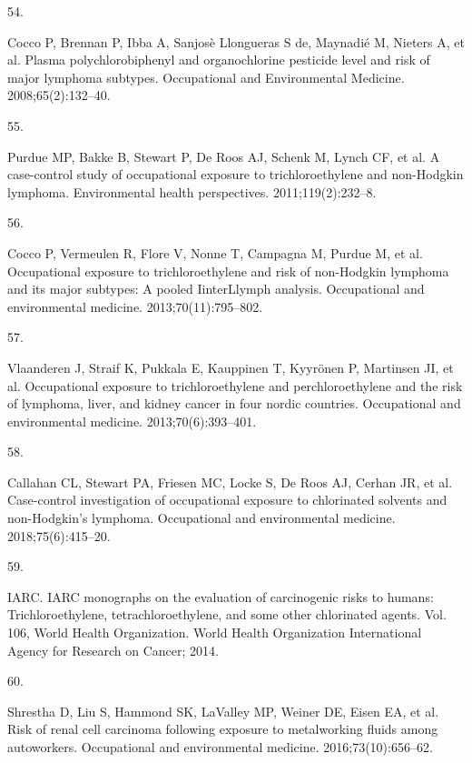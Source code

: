 \documentclass[
  11pt,
  letterpaper,
  DIV=11,
  numbers=noendperiod]{scrartcl}
\newlength{\cslhangindent}
\newlength{\csllabelwidth}
\newenvironment{CSLReferences}[2] %
 {\begin{list}{}{%
  \setlength{\itemindent}{0pt}
  \setlength{\leftmargin}{0pt}
  \setlength{\parsep}{0pt}
  \ifodd #1
   \setlength{\leftmargin}{\cslhangindent}
   \setlength{\itemindent}{-1\cslhangindent}
  \fi
  \setlength{\itemsep}{#2\baselineskip}}}
 {\end{list}}
\newcommand{\CSLLeftMargin}[1]{\parbox[t]{\csllabelwidth}{\strut#1\strut}}
\newcommand{\CSLRightInline}[1]{\parbox[t]{\linewidth - \csllabelwidth}{\strut#1\strut}}
\begin{document}
\begin{CSLReferences}{1}{0}
\CSLLeftMargin{54. }%
\CSLRightInline{Cocco P, Brennan P, Ibba A, Sanjosè Llongueras S de,
Maynadié M, Nieters A, et al. Plasma polychlorobiphenyl and
organochlorine pesticide level and risk of major lymphoma subtypes.
Occupational and Environmental Medicine. 2008;65(2):132--40. }

\CSLLeftMargin{55. }%
\CSLRightInline{Purdue MP, Bakke B, Stewart P, De Roos AJ, Schenk M,
Lynch CF, et al. A case-control study of occupational exposure to
trichloroethylene and non-{Hodgkin} lymphoma. Environmental health
perspectives. 2011;119(2):232--8. }

\CSLLeftMargin{56. }%
\CSLRightInline{Cocco P, Vermeulen R, Flore V, Nonne T, Campagna M,
Purdue M, et al. Occupational exposure to trichloroethylene and risk of
non-{Hodgkin} lymphoma and its major subtypes: A pooled IinterLlymph
analysis. Occupational and environmental medicine. 2013;70(11):795--802.
}

\CSLLeftMargin{57. }%
\CSLRightInline{Vlaanderen J, Straif K, Pukkala E, Kauppinen T, Kyyrönen
P, Martinsen JI, et al. Occupational exposure to trichloroethylene and
perchloroethylene and the risk of lymphoma, liver, and kidney cancer in
four nordic countries. Occupational and environmental medicine.
2013;70(6):393--401. }

\CSLLeftMargin{58. }%
\CSLRightInline{Callahan CL, Stewart PA, Friesen MC, Locke S, De Roos
AJ, Cerhan JR, et al. Case-control investigation of occupational
exposure to chlorinated solvents and non-{Hodgkin}'s lymphoma.
Occupational and environmental medicine. 2018;75(6):415--20. }

\CSLLeftMargin{59. }%
\CSLRightInline{IARC. IARC monographs on the evaluation of carcinogenic
risks to humans: Trichloroethylene, tetrachloroethylene, and some other
chlorinated agents. Vol. 106, World Health Organization. World Health
Organization International Agency for Research on Cancer; 2014. }

\CSLLeftMargin{60. }%
\CSLRightInline{Shrestha D, Liu S, Hammond SK, LaValley MP, Weiner DE,
Eisen EA, et al. Risk of renal cell carcinoma following exposure to
metalworking fluids among autoworkers. Occupational and environmental
medicine. 2016;73(10):656--62. }

\end{CSLReferences}
\end{document}
